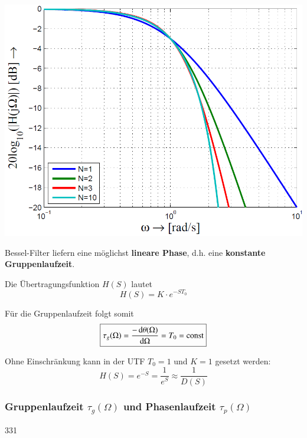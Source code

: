 \begin{minipage}[c]{0.45\columnwidth}
    \includegraphics[width=\columnwidth]{images/filter_bessel_amplitudengang.png}
\end{minipage}
\hfill
\begin{minipage}[c]{0.48\columnwidth}
    Bessel-Filter liefern eine möglichst \textbf{lineare Phase}, d.h. eine \textbf{konstante Gruppenlaufzeit}.

    Die Übertragungsfunktion $H(S)$ lautet
    $$ \boxed{ H(S) = K \cdot e^{-S T_0} } $$

    Für die Gruppenlaufzeit folgt somit
    $$ \boxed{ \tau_g(\Omega) = \frac{- \mathop{} \! \mathrm{d} \theta(\Omega)}{\mathop{} \! \mathrm{d} \Omega} = T_0 = \mathrm{const} } $$
\end{minipage}

\vspace{0.2cm}
Ohne Einschränkung kann in der UTF $T_0 = 1$ und $K = 1$ gesetzt werden:
$$ H(S) = e^{-S} = \frac{1}{e^S} \approx \frac{1}{D(S)} $$


\subsubsection{Gruppenlaufzeit $\tau_g(\Omega)$ und Phasenlaufzeit $\tau_p(\Omega)$}{331}

